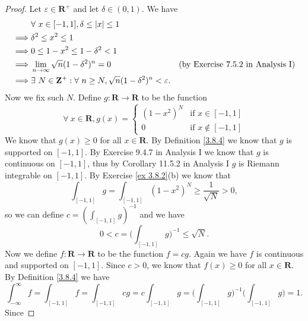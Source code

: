 \begin{proof}
    Let \(\varepsilon \in \mathbf{R}^+\) and let \(\delta \in (0, 1)\).
    We have
    \begin{align*}
                 & \forall\ x \in [-1, 1], \delta \leq \abs*{x} \leq 1                                                                                  \\
        \implies & \delta^2 \leq x^2 \leq 1                                                                                                             \\
        \implies & 0 \leq 1 - x^2 \leq 1 - \delta^2 < 1                                                                                                 \\
        \implies & \lim_{n \to \infty} \sqrt{n} (1 - \delta^2)^n = 0                                         & \text{(by Exercise 7.5.2 in Analysis I)} \\
        \implies & \exists\ N \in \mathbf{Z}^+ : \forall\ n \geq N, \sqrt{n} (1 - \delta^2)^n < \varepsilon.
    \end{align*}
    Now we fix such \(N\).
    Define \(g : \mathbf{R} \to \mathbf{R}\) to be the function
    \[
        \forall\ x \in \mathbf{R}, g(x) = \begin{cases}
            (1 - x^2)^N & \text{if } x \in [-1, 1]    \\
            0           & \text{if } x \notin [-1, 1]
        \end{cases}
    \]
    We know that \(g(x) \geq 0\) for all \(x \in \mathbf{R}\).
    By Definition \ref{3.8.4} we know that \(g\) is supported on \([-1, 1]\).
    By Exercise 9.4.7 in Analysis I we know that \(g\) is continuous on \([-1, 1]\), thus by Corollary 11.5.2 in Analysis I \(g\) is Riemann integrable on \([-1, 1]\).
    By Exercise \ref{ex 3.8.2}(b) we know that
    \[
        \int_{[-1, 1]} g = \int_{[-1, 1]} (1 - x^2)^N \geq \frac{1}{\sqrt{N}} > 0,
    \]
    so we can define \(c = (\int_{[-1, 1]} g)^{-1}\) and we have
    \[
        0 < c = \bigg(\int_{[-1, 1]} g\bigg)^{-1} \leq \sqrt{N}.
    \]
    Now we define \(f : \mathbf{R} \to \mathbf{R}\) to be the function \(f = cg\).
    Again we have \(f\) is continuous and supported on \([-1, 1]\).
    Since \(c > 0\), we know that \(f(x) \geq 0\) for all \(x \in \mathbf{R}\).
    By Definition \ref{3.8.4} we have
    \[
        \int_{-\infty}^\infty f = \int_{[-1, 1]} f = \int_{[-1, 1]} cg = c \int_{[-1, 1]} g = \bigg(\int_{[-1, 1]} g\bigg)^{-1} \bigg(\int_{[-1, 1]} g\bigg) = 1.
    \]
    Since

\end{proof}
